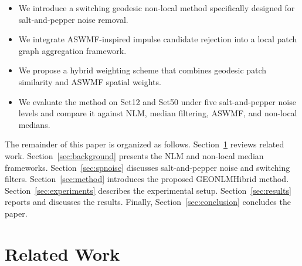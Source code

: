 \documentclass{ieeeaccess}
\begin{document}
\begin{itemize}
    \item We introduce a switching geodesic non-local method specifically designed for salt-and-pepper noise removal.
    \item We integrate ASWMF-inspired impulse candidate rejection into a local patch graph aggregation framework.
    \item We propose a hybrid weighting scheme that combines geodesic patch similarity and ASWMF spatial weights.
    \item We evaluate the method on Set12 and Set50 under five salt-and-pepper noise levels and compare it against NLM, median filtering, ASWMF, and non-local medians.
\end{itemize}

The remainder of this paper is organized as follows. Section~\ref{sec:related} reviews related work. Section~\ref{sec:background} presents the NLM and non-local median frameworks. Section~\ref{sec:spnoise} discusses salt-and-pepper noise and switching filters. Section~\ref{sec:method} introduces the proposed GEONLMHibrid method. Section~\ref{sec:experiments} describes the experimental setup. Section~\ref{sec:results} reports and discusses the results. Finally, Section~\ref{sec:conclusion} concludes the paper.

\section{Related Work}
\label{sec:related}
\end{document}
